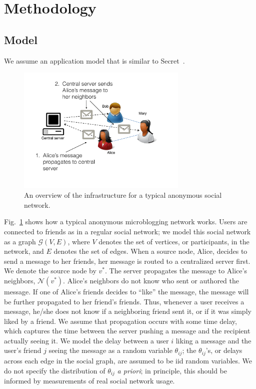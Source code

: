 \section{Methodology}

\subsection{Model}

We assume an application model that is similar to Secret~\cite{secret}.
\begin{figure}
\centering
\includegraphics[height = 2.4in]{figures/secret_infrastructure}
\caption{An overview of the infrastructure for a typical anonymous social network.}
\label{fig:secret_infrastructure}
\end{figure}
Fig.~\ref{fig:secret_infrastructure} shows how a typical anonymous microblogging network works. Users are connected to friends as in a regular social network; we model this social network as a graph $\mathcal G(V,E)$, where $V$ denotes the set of vertices, or participants, in the network, and $E$ denotes the set of edges. When a source node, Alice, decides to send a message to her friends, her message is routed to a centralized server first. We denote the source node by $v^*$. The server propagates the message to Alice's neighbors, $\mathcal N(v^*)$. Alice's neighbors do not know who sent or authored the message. %
If one of Alice's friends decides to ``like'' the message, the message will be further propagated to her friend's friends. Thus, whenever a user receives a message, he/she does not know if a neighboring friend sent it, or if it was simply liked by a friend. We assume that propagation occurs with some time delay, which captures the time between the server pushing a message and the recipient actually seeing it. We model the delay between a user $i$ liking a message and the user's friend $j$ seeing the message as a random variable $\theta_{ij}$; the $\theta_{ij}$'s, or delays across each edge in the social graph, are assumed to be iid random variables. We do not specify the distribution of $\theta_{ij}$ \emph{a priori}; in principle, this should be informed by measurements of real social network usage.

